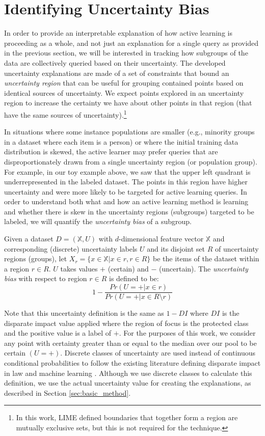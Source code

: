 \section{Identifying Uncertainty Bias}
In order to provide an interpretable explanation of how active learning is proceeding as a whole, and not just an explanation for a single query as provided in the previous section, we will be interested in tracking how subgroups of the data are collectively queried based on their uncertainty.  The developed uncertainty explanations are made of a set of constraints that bound an \emph{uncertainty region} that can be useful for grouping contained points based on identical sources of uncertainty.  We expect points explored in an  uncertainty region to increase the certainty we have about other points in that region (that have the same sources of uncertainty).\footnote{In this work, LIME defined boundaries that together form a region are mutually exclusive sets, but this is not required for the technique.}

In situations where some instance populations are smaller (e.g., minority groups in a dataset where each item is a person) or where the initial training data distribution is skewed, the active learner may prefer queries that are disproportionately drawn from a single uncertainty region (or population group). For example, in our toy example above, we saw that the upper left quadrant is underrepresented in the labeled dataset. The points in this region have higher uncertainty and were more likely to be targeted for active learning queries.  In order to understand both what and how an active learning method is learning and whether there is skew in the uncertainty regions (subgroups) targeted to be labeled, we will quantify the \emph{uncertainty bias} of a subgroup.

\begin{definition}
Given a dataset $D = (\mathbb{X}, U)$ with $d$-dimensional feature vector $\mathbb{X}$ and corresponding (discrete) uncertainty labels $U$ and its disjoint set $R$ of uncertainty regions (groups), let $X_r = \{ x \in \mathbb{X} | x \in r, r \in R \}$ be the items of the dataset within a region $r \in R$.  $U$ takes values $+$ (certain) and $-$ (uncertain).  The \emph{uncertainty bias} with respect to region $r \in R$ is defined to be:
\[ 1 - \frac{Pr(U = + | x \in r)}{Pr(U = + | x \in R \setminus r)} \]
\end{definition}
\noindent Note that this uncertainty definition is the same as $1 - DI$ where $DI$ is the disparate impact value \cite{2015_kdd_disparate_impact} applied where the region of focus is the protected class and the positive value is a label of $+$.  For the purposes of this work, we consider any point with certainty greater than or equal to the median over our pool to be certain $(U = +)$. Discrete classes of uncertainty are used instead of continuous conditional probabilities to follow the existing literature defining disparate impact in law and machine learning \cite{Barocas16DisparateImpact, 2015_kdd_disparate_impact}.  Although we use discrete classes to calculate this definition, we use the actual uncertainty value for creating the explanations, as described in Section \ref{sec:basic_method}.

